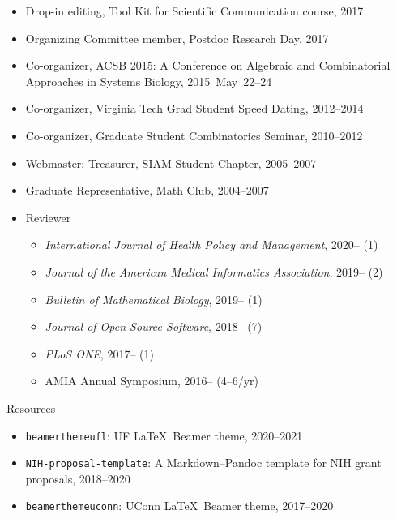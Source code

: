 \documentclass[10pt,a4paper]{article}
\begin{document}
\begin{itemize}[label=$\circ$,nolistsep]
\item
Drop-in editing, Tool Kit for Scientific Communication course, 2017
\item
Organizing Committee member, Postdoc Research Day, 2017
\item
Co-organizer, ACSB 2015: A Conference on Algebraic and Combinatorial Approaches in Systems Biology, 2015~May~22--24
\item
Co-organizer, Virginia Tech Grad Student Speed Dating, 2012--2014
\item
Co-organizer, Graduate Student Combinatorics Seminar, 2010--2012
\item
Webmaster; Treasurer, SIAM Student Chapter, 2005--2007
\item
Graduate Representative, Math Club, 2004--2007
\item
Reviewer
\begin{itemize}[label=$\circ$,nolistsep]
\item
{\itshape International Journal of Health Policy and Management}, 2020-- (1)
\item
{\itshape Journal of the American Medical Informatics Association}, 2019-- (2)
\item
{\itshape Bulletin of Mathematical Biology}, 2019-- (1)
\item
{\itshape Journal of Open Source Software}, 2018-- (7)
\item
{\itshape PLoS ONE}, 2017-- (1)
\item
AMIA Annual Symposium, 2016-- (4--6/yr)
\end{itemize}
\end{itemize}

\vspace{.25cm}
{\sc Resources}
\begin{itemize}[label=$\circ$,nolistsep]
\item
{\tt\small beamerthemeufl}: UF \LaTeX\ {\sffamily Beamer} theme, 2020--2021
\item
{\tt\small NIH-proposal-template}: A Markdown--Pandoc template for NIH grant proposals, 2018--2020
\item
{\tt\small beamerthemeuconn}: UConn \LaTeX\ {\sffamily Beamer} theme, 2017--2020
\end{itemize}
\end{document}
